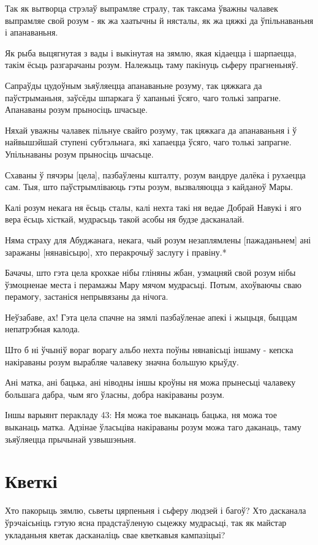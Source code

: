 \documentclass{article}
\begin{document}
Так як вытворца стрэлаў выпрамляе стралу, так таксама ўважны чалавек
выпрамляе свой розум - як жа хаатычны й нясталы, як жа цяжкі да
ўпільнаваньня і апанаваньня.

Як рыба выцягнутая з вады і выкінутая на зямлю, якая кідаецца і
шарпаецца, такім ёсьць разгарачаны розум. Належыць таму пакінуць сьферу
прагненьняў.

Сапраўды цудоўным зьяўляецца апанаваньне розуму, так цяжкага да
паўстрыманьня, заўсёды шпаркага ў хапаньні ўсяго, чаго толькі запрагне.
Апанаваны розум прыносіць шчасьце.

Няхай уважны чалавек пільнуе свайго розуму, так цяжкага да
апанаваньня і ў найвышэйшай ступені субтэльнага, які хапаецца ўсяго,
чаго толькі запрагне. Упільнаваны розум прыносіць шчасьце.

Схаваны ў пячэры {[}цела{]}, пазбаўлены кшталту, розум вандруе
далёка і рухаецца сам. Тыя, што паўстрымліваюць гэты розум, вызваляюцца
з кайданоў Мары.

Калі розум некага ня ёсьць сталы, калі нехта такі ня ведае Добрай
Навукі і яго вера ёсьць хісткай, мудрасьць такой асобы ня будзе
дасканалай.

Няма страху для Абуджанага, некага, чый розум незаплямлены
{[}пажаданьнем{]} ані заражаны {[}нянавісьцю{]}, хто перакрочыў заслугу
і правіну.*

Бачачы, што гэта цела крохкае нібы гліняны жбан, узмацняй свой розум
нібы ўзмоцненае места і перамажы Мару мячом мудрасьці. Потым, ахоўваючы
сваю перамогу, застаніся непрывязаны да нічога.

Неўзабаве, ах! Гэта цела спачне на зямлі пазбаўленае апекі і жыцьця,
быццам непатрэбная калода.

Што б ні ўчыніў вораг ворагу альбо нехта поўны нянавісьці іншаму -
кепска накіраваны розум вырабляе чалавеку значна большую крыўду.

Ані матка, ані бацька, ані ніводны іншы кроўны ня можа прынесьці
чалавеку большага дабра, чым яго ўласны, добра накіраваны розум.

Іншы варыянт перакладу 43: Ня можа тое выканаць бацька, ня можа тое
выканаць матка. Адзінае ўласьціва накіраваны розум можа таго даканаць,
таму зьяўляецца прычынай узвышэньня.

\section{Кветкі}

Хто пакорыць зямлю, сьветы цярпеньня і сьферу людзей і багоў? Хто
дасканала ўрэчаісьніць гэтую ясна прадстаўленую сьцежку мудрасьці, так
як майстар укладаньня кветак дасканаліць свае кветкавыя кампазіцыі?
\end{document}
